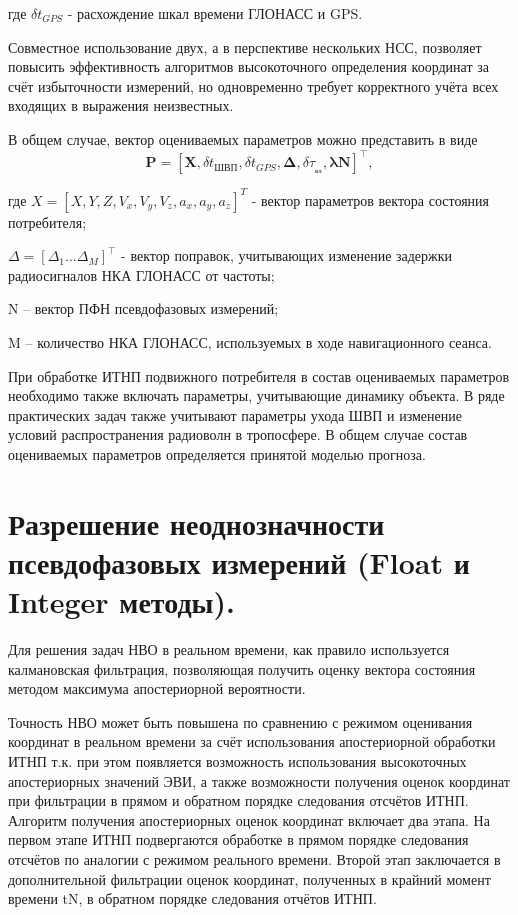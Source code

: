 \documentclass[14pt,a4paper,oneside]{extarticle}
\begin{document}
где $\delta t_{GPS}$ - расхождение шкал времени ГЛОНАСС и GPS.

Совместное использование двух, а в перспективе нескольких НСС, позволяет повысить эффективность алгоритмов высокоточного определения координат за счёт избыточности измерений, но одновременно требует корректного учёта всех входящих в выражения неизвестных.

В общем случае, вектор оцениваемых параметров можно представить в виде \[\boldsymbol{P}=[\boldsymbol{X},\delta t_{\text{ШВП}},\delta t_{GPS},\boldsymbol{\Delta},\delta\tau_{_{\text{вл}}},\boldsymbol{\lambda N}]^{\intercal},\]

где $X=[X,Y,Z,V_x,V_y,V_z,a_x,a_y,a_z]^{T}$ - вектор параметров вектора состояния потребителя;

$\Delta=[\Delta_1...\Delta_M]^{\top}$ - вектор поправок, учитывающих изменение задержки радиосигналов НКА ГЛОНАСС от частоты;

N – вектор ПФН псевдофазовых измерений; 

M – количество НКА ГЛОНАСС, используемых в ходе навигационного сеанса.

При обработке ИТНП подвижного потребителя в состав оцениваемых параметров необходимо также включать параметры, учитывающие динамику объекта. В ряде практических задач также учитывают параметры ухода ШВП и изменение условий распространения радиоволн в тропосфере. В общем случае состав оцениваемых параметров определяется принятой моделью прогноза.

\section{Разрешение неоднозначности псевдофазовых измерений (Float и Integer методы).}

Для решения задач НВО в реальном времени, как правило используется калмановская фильтрация, позволяющая получить оценку вектора состояния методом максимума апостериорной вероятности.

Точность НВО может быть повышена по сравнению с режимом оценивания координат в реальном времени за счёт использования апостериорной обработки ИТНП т.к. при этом появляется возможность использования высокоточных апостериорных значений ЭВИ, а также возможности получения оценок координат при фильтрации в прямом и обратном порядке следования отсчётов ИТНП.
Алгоритм получения апостериорных оценок координат включает два этапа. На первом этапе ИТНП подвергаются обработке в прямом порядке следования отсчётов по аналогии с режимом реального времени. Второй этап заключается в дополнительной фильтрации оценок координат, полученных в крайний момент времени tN, в обратном порядке следования отчётов ИТНП.
\end{document}
